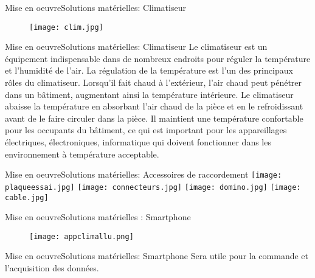 \documentclass{beamer}
\begin{document}
	\begin{frame}{Mise en oeuvre}{Solutions matérielles: Climatiseur}
		\begin{figure}\centering
			\texttt{[image: clim.jpg]}
		\end{figure}	
	\end{frame}
	
	\begin{frame}{Mise en oeuvre}{Solutions matérielles: Climatiseur}
		Le climatiseur est un équipement indispensable dans de nombreux endroits pour réguler la température et l'humidité de l'air. La régulation de la température est l'un des principaux rôles du climatiseur. Lorsqu'il fait chaud à l'extérieur, l'air chaud peut pénétrer dans un bâtiment, augmentant ainsi la température intérieure. Le climatiseur abaisse la température en absorbant l'air chaud de la pièce et en le refroidissant avant de le faire circuler dans la pièce. Il maintient une température confortable pour les occupants du bâtiment, ce qui est important pour les appareillages électriques, électroniques, informatique qui doivent fonctionner dans les environnement à température acceptable.
		
	\end{frame}
	
	\begin{frame}{Mise en oeuvre}{Solutions matérielles: Accessoires de raccordement}
		\centering
		\texttt{[image: plaqueessai.jpg]}
		\texttt{[image: connecteurs.jpg]}
		\texttt{[image: domino.jpg]}
		\texttt{[image: cable.jpg]}
		
	\end{frame}
		
	\begin{frame}{Mise en oeuvre}{Solutions matérielles : Smartphone}
		\begin{figure}\centering
			\texttt{[image: appclimallu.png]}
		\end{figure}
		
	\end{frame}
	
	\begin{frame}{Mise en oeuvre}{Solutions matérielles: Smartphone}
		Sera utile pour la commande et l'acquisition des données.
	\end{frame}
	
\end{document}
